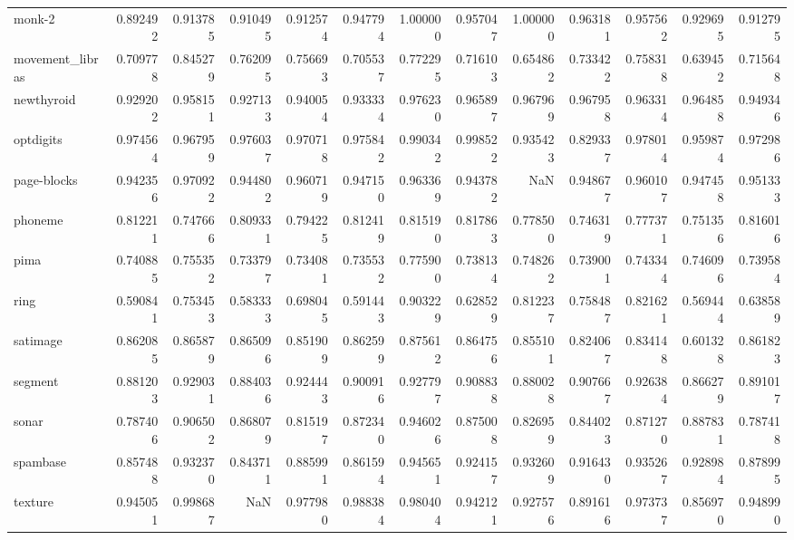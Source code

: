 \begin{tabular}{lrrrrrrrrrrrr}
monk-2          &   0.892492 &  0.913785 &  0.910495 &  0.912574 &  0.947794 &  1.000000 &  0.957047 &  1.000000 &  0.963181 &  0.957562 &  0.929695 &  0.912795 \\
movement\_libras &   0.709778 &  0.845279 &  0.762095 &  0.756693 &  0.705537 &  0.772295 &  0.716103 &  0.654862 &  0.733422 &  0.758318 &  0.639452 &  0.715648 \\
newthyroid      &   0.929202 &  0.958151 &  0.927133 &  0.940054 &  0.933334 &  0.976230 &  0.965897 &  0.967969 &  0.967958 &  0.963314 &  0.964858 &  0.949346 \\
optdigits       &   0.974564 &  0.967959 &  0.976037 &  0.970718 &  0.975842 &  0.990342 &  0.998522 &  0.935423 &  0.829337 &  0.978014 &  0.959874 &  0.972986 \\
page-blocks     &   0.942356 &  0.970922 &  0.944802 &  0.960719 &  0.947150 &  0.963369 &  0.943782 &       NaN &  0.948677 &  0.960107 &  0.947458 &  0.951333 \\
phoneme         &   0.812211 &  0.747666 &  0.809331 &  0.794225 &  0.812419 &  0.815190 &  0.817863 &  0.778500 &  0.746319 &  0.777371 &  0.751356 &  0.816016 \\
pima            &   0.740885 &  0.755352 &  0.733797 &  0.734081 &  0.735532 &  0.775900 &  0.738134 &  0.748262 &  0.739001 &  0.743344 &  0.746096 &  0.739584 \\
ring            &   0.590841 &  0.753453 &  0.583333 &  0.698045 &  0.591443 &  0.903229 &  0.628529 &  0.812237 &  0.758487 &  0.821621 &  0.569444 &  0.638589 \\
satimage        &   0.862085 &  0.865879 &  0.865096 &  0.851909 &  0.862599 &  0.875612 &  0.864756 &  0.855101 &  0.824067 &  0.834148 &  0.601328 &  0.861823 \\
segment         &   0.881203 &  0.929031 &  0.884036 &  0.924443 &  0.900916 &  0.927797 &  0.908838 &  0.880028 &  0.907667 &  0.926384 &  0.866279 &  0.891017 \\
sonar           &   0.787406 &  0.906502 &  0.868079 &  0.815197 &  0.872340 &  0.946026 &  0.875008 &  0.826959 &  0.844023 &  0.871270 &  0.887831 &  0.787418 \\
spambase        &   0.857488 &  0.932370 &  0.843711 &  0.885991 &  0.861594 &  0.945651 &  0.924157 &  0.932609 &  0.916430 &  0.935267 &  0.928984 &  0.878995 \\
texture         &   0.945051 &  0.998687 &       NaN &  0.977980 &  0.988384 &  0.980404 &  0.942121 &  0.927576 &  0.891616 &  0.973737 &  0.856970 &  0.948990 \\

\end{tabular}
